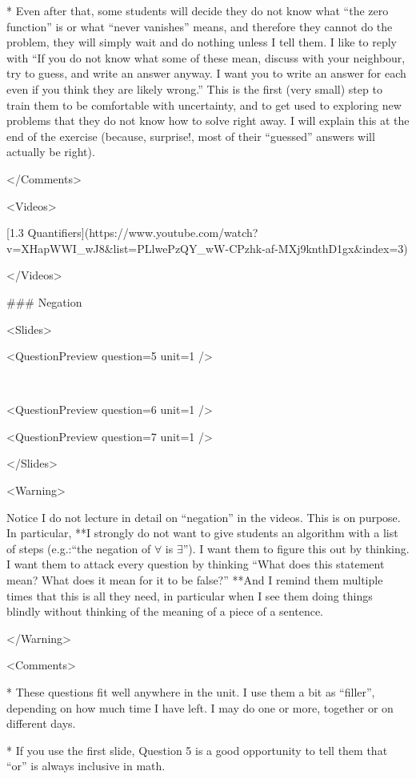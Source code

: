 *   Even after that, some students will decide they do not know what “the zero function” is or what “never vanishes” means, and therefore they cannot do the problem, they will simply wait and do nothing unless I tell them. I like to reply with “If you do not know what some of these mean, discuss with your neighbour, try to guess, and write an answer anyway. I want you to write an answer for each even if you think they are likely wrong.” This is the first (very small) step to train them to be comfortable with uncertainty, and to get used to exploring new problems that they do not know how to solve right away. I will explain this at the end of the exercise (because, surprise!, most of their “guessed” answers will actually be right).

</Comments>

<Videos>

[1.3 Quantifiers](https://www.youtube.com/watch?v=XHapWWI_wJ8\&list=PLlwePzQY_wW-CPzhk-af-MXj9knthD1gx\&index=3)

</Videos>

### Negation

<Slides>

<QuestionPreview question={5} unit={1} />

 

<QuestionPreview question={6} unit={1} />

<QuestionPreview question={7} unit={1} />

</Slides>

<Warning>

Notice I do not lecture in detail on “negation” in the videos. This is on purpose. In particular, **I strongly do not want to give students an algorithm with a list of steps (e.g.:“the negation of $\forall$ is $\exists$”). I want them to figure this out by thinking. I want them to attack every question by thinking “What does this statement mean? What does it mean for it to be false?” **And I remind them multiple times that this is all they need, in particular when I see them doing things blindly without thinking of the meaning of a piece of a sentence.

</Warning>

<Comments>

*   These questions fit well anywhere in the unit. I use them a bit as “filler”, depending on how much time I have left. I may do one or more, together or on different days.

*   If you use the first slide, Question 5 is a good opportunity to tell them that “or” is always inclusive in math.

